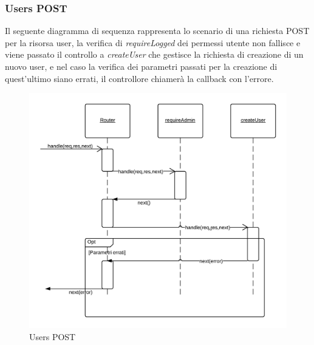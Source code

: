 \subsubsection{Users POST} 
Il seguente diagramma di sequenza rappresenta lo scenario di una richiesta POST per la risorsa user, la verifica di \emph{requireLogged} dei permessi utente non fallisce e viene passato il controllo a \emph{createUser} che gestisce la richiesta di creazione di un nuovo user, e nel caso la verifica dei parametri passati per la creazione di quest'ultimo siano errati, il controllore chiamerà la callback con l'errore.
\begin{figure}[H]
	\begin{center} 
		\includegraphics[scale=0.20]{scenari/Users POST.png} 
		\caption{Users POST}
	\end{center} 
\end{figure}

